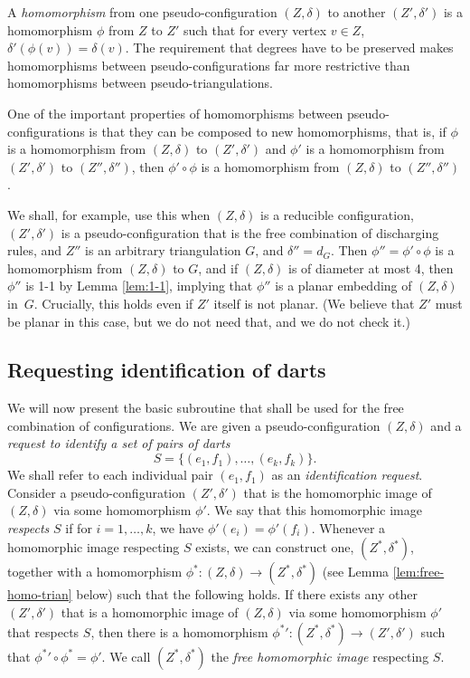 \documentclass[10pt,a4paper]{article}
\begin{document}
A \emph{homomorphism} from one pseudo-configuration $(Z,\delta)$ to another 
$(Z',\delta')$
is a homomorphism $\phi$ from
$Z$ to $Z'$ such that for every vertex $v\in Z$, $\delta'(\phi(v))=\delta(v)$.
The requirement that degrees have to be preserved makes homomorphisms between pseudo-configurations far more restrictive than homomorphisms between pseudo-triangulations.


One of the important properties of homomorphisms between pseudo-configurations is that they can be composed to new homomorphisms, that is, if
$\phi$ is a homomorphism from $(Z,\delta)$ to $(Z',\delta')$ and 
$\phi'$ is a homomorphism from $(Z',\delta')$ to $(Z'',\delta'')$, then $\phi'\circ\phi$ is a homomorphism from 
$(Z,\delta)$ to $(Z'',\delta'')$.

We shall, for example, use this when $(Z,\delta)$ is a reducible configuration,
$(Z',\delta')$ is a pseudo-configuration that is the free combination of discharging rules, 
and $Z''$ is an arbitrary triangulation $G$, and $\delta''=d_G$.
Then $\phi''=\phi'\circ\phi$ is a homomorphism from $(Z,\delta)$ to $G$, and if 
$(Z,\delta)$ is of diameter at most 4, then $\phi''$ is 1-1 by Lemma \ref{lem:1-1}, implying that $\phi''$ is a planar embedding of $(Z,\delta)$ in~$G$.
Crucially, this holds even if 
$Z'$ itself is not planar.
(We believe that $Z'$ must be planar in this case, but we do not need that, and we do not check it.)




\subsection{Requesting identification of darts}

We will now present the basic subroutine that shall be used for the free combination of configurations.
We are given a pseudo-configuration $(Z,\delta)$ and a \emph{request to identify a set of pairs of darts} 
\[S=\{(e_1,f_1),\ldots, (e_k,f_k)\}.\]
We shall refer to each individual pair $(e_1,f_1)$ as an \emph{identification request}. Consider a pseudo-configuration $(Z',\delta')$ that is
the homomorphic image of $(Z,\delta)$ via some homomorphism $\phi'$.
We say that this homomorphic image \emph{respects} $S$ if for $i=1,\ldots,k$, we have
$\phi'(e_i)=\phi'(f_i)$.
Whenever a homomorphic image respecting $S$ exists,
we can construct one, $(Z^*,\delta^*)$, together with a homomorphism 
$\phi^*: (Z,\delta) \to (Z^*,\delta^*)$ (see Lemma \ref{lem:free-homo-trian} below) such that the following holds. 
If there exists any other $(Z',\delta')$ that is a homomorphic image of $(Z,\delta)$
via some homomorphism $\phi'$ that respects $S$, then there is a homomorphism ${\phi^*}' : (Z^*,\delta^*) \to (Z',\delta')$ such that ${\phi^*}' \circ \phi^*=\phi'$.
We call $(Z^*,\delta^*)$ the \emph{free homomorphic image} respecting $S$.
\end{document}

